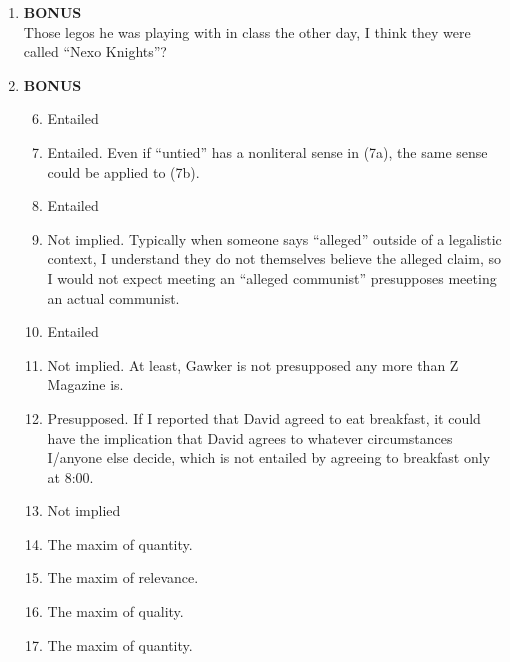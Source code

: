 \documentclass[a4paper, 11pt]{article}
\begin{document}
\begin{enumerate}[label=\textbf{\arabic*.}]
\item \textbf{BONUS}\\ Those legos he was playing with in class the other day, I think they
were called ``Nexo Knights''?
\item \textbf{BONUS}
\begin{enumerate}[label=\arabic*.]
    \setcounter{enumii}{5}
    \item Entailed
    \item Entailed. Even if ``untied'' has a nonliteral sense in (7a), the same 
    sense could be applied to (7b).
    \item Entailed
    \item Not implied. Typically when someone says ``alleged'' outside of a legalistic
    context, I understand they do not themselves believe the alleged claim, so I would not
    expect meeting an ``alleged communist'' presupposes meeting an actual communist.
    \item Entailed
    \item Not implied. At least, Gawker is not presupposed any more than Z Magazine is.
    \item Presupposed. If I reported that David agreed to eat breakfast, it could have
    the implication that David agrees to whatever circumstances I/anyone else decide,
    which is not entailed by agreeing to breakfast only at 8:00.
    \item Not implied
    \item The maxim of quantity.
    \item The maxim of relevance.
    \item The maxim of quality.
    \item The maxim of quantity.
\end{enumerate}

\end{enumerate}
\end{document}
